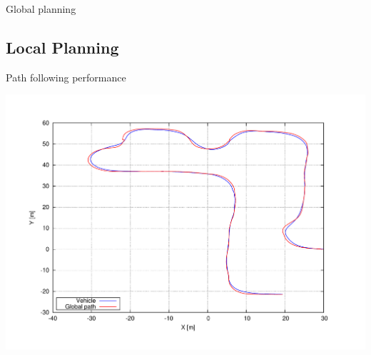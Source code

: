 \begin{frame}{Global planning}
  \begin{center}
  \end{center}
\end{frame}

\subsection{Local Planning}

\begin{frame}{Path following performance}
  \begin{center}
    \includegraphics[width=\textwidth,trim=50 50 90 60, clip]{differences}
  \end{center}
\end{frame}

